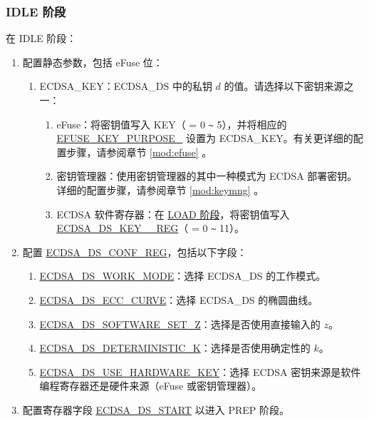 \documentclass[main\_\_CN.tex]{subfiles}
\begin{document}
\subsubsection{IDLE 阶段}
在 IDLE 阶段：
\begin{enumerate}
	\item 配置静态参数，包括 eFuse 位：
	      \begin{enumerate}
		      \item ECDSA\_KEY：ECDSA\_DS 中的私钥 $d$ 的值。请选择以下密钥来源之一：
                \begin{enumerate}
                    \item eFuse：将密钥值写入 KEY（ = 0 \verb+~+ 5），并将相应的 \hyperref[regdesc:EFUSEKEYPURPOSE0]{EFUSE\_KEY\_PURPOSE\_} 设置为 ECDSA\_KEY。有关更详细的配置步骤，请参阅章节 \ref{mod:efuse} \textit{}。
                    \item 密钥管理器：使用密钥管理器的其中一种模式为 ECDSA 部署密钥。详细的配置步骤，请参阅章节 \ref{mod:keymng} \textit{}。
                    \item ECDSA 软件寄存器：在 \hyperref[sec:ecdsa-software-key-load-stage]{LOAD 阶段}，将密钥值写入 \hyperref[regdesc:ECDSADSKEY0REG]{ECDSA\_DS\_KEY\_\_REG}（ = 0 \verb+~+ 11）。
               \end{enumerate}
	      \end{enumerate}
	\item 配置 \hyperref[regdesc:ECDSADSCONFREG]{ECDSA\_DS\_CONF\_REG}，包括以下字段：
	      \begin{enumerate}
		      \item \hyperref[fielddesc:ECDSADSWORKMODE]{ECDSA\_DS\_WORK\_MODE}：选择 ECDSA\_DS 的工作模式。
		      \item \hyperref[fielddesc:ECDSADSECCCURVE]{ECDSA\_DS\_ECC\_CURVE}：选择 ECDSA\_DS 的椭圆曲线。
		      \item \hyperref[fielddesc:ECDSADSSOFTWARESETZ]{ECDSA\_DS\_SOFTWARE\_SET\_Z}：选择是否使用直接输入的 $z$。
		    \item \hyperref[fielddesc:ECDSADSDETERMINISTICK]{ECDSA\_DS\_DETERMINISTIC\_K}：选择是否使用确定性的 $k$。
                \item \hyperref[fielddesc:ECDSADSUSEHARDWAREKEY]{ECDSA\_DS\_USE\_HARDWARE\_KEY}：选择 ECDSA 密钥来源是软件编程寄存器还是硬件来源（eFuse 或密钥管理器）。
	      \end{enumerate}
	\item 配置寄存器字段 \hyperref[fielddesc:ECDSADSSTART]{ECDSA\_DS\_START} 以进入 PREP 阶段。
\end{enumerate}
\end{document}
